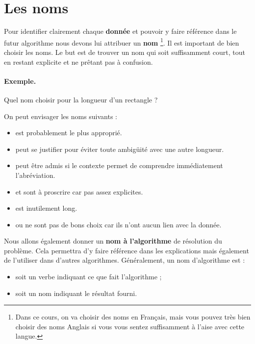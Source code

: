 	\section{Les noms}
	
		Pour identifier clairement chaque \textbf{donnée}
		et pouvoir y faire référence dans le futur algorithme
		nous devons lui attribuer un \textbf{nom}%
		\footnote{%
				Dans ce cours, on va choisir des noms en Français,
				mais vous pouvez très bien choisir
				des noms Anglais si vous vous sentez
				suffisamment à l'aise avec cette langue.
		}.
		Il est important de bien choisir les noms. 
		Le but est de trouver un nom qui soit suffisamment court,
		tout en restant explicite et ne prêtant pas à confusion.
		
\clearpage
	
		\begin{Emphase}
			\paragraph{Exemple.}	
			Quel nom choisir pour la longueur d'un rectangle ?
	
			On peut envisager les noms suivants :
			\begin{itemize}
			\item
				 est probablement le plus approprié.
			\item
				 peut se justifier
				pour éviter toute ambigüité avec une autre longueur.
			\item
				 peut être admis
				si le contexte permet de comprendre immédiatement
				l’abréviation.
			\item
				 et  sont à proscrire car pas assez explicites.
			\item
				 est inutilement long. 
			\item
				 ou  ne sont pas de bons choix
				car ils n'ont aucun lien avec la donnée.
			\end{itemize}
		\end{Emphase}
		
		Nous allons également donner un \textbf{nom à l'algorithme}
		de résolution du problème.
		Cela permettra d'y faire référence dans les explications
		mais également de l'utiliser dans d'autres algorithmes.
		Généralement, un nom d'algorithme est :
		\begin{itemize}
		\item soit un verbe indiquant ce que fait l'algorithme ;
		\item soit un nom indiquant le résultat fourni.	
		\end{itemize}
	
